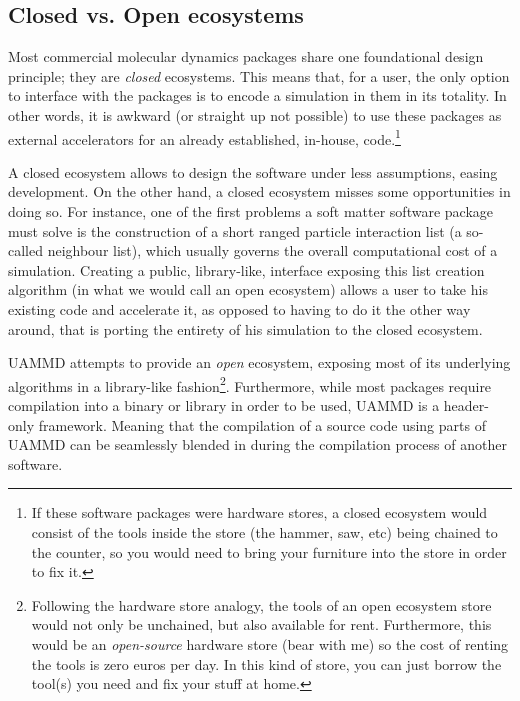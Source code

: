 \documentclass[twoside,openright,titlepage,numbers=noenddot,%
headinclude,footinclude,cleardoublepage=empty,abstract=on,
BCOR=5mm,fontsize=11pt, dvipsnames, paper=b5
]{scrreprt}
\newcommand{\uammd}{\gls{UAMMD}\xspace}
\newcommand{\gpu}{\gls{GPU}\xspace}
\begin{document}
\subsection*{Closed vs. Open ecosystems}
Most commercial molecular dynamics packages share one foundational design principle; they are \emph{closed} ecosystems. This means that, for a user, the only option to interface with the packages is to encode a simulation in them in its totality. In other words, it is awkward (or straight up not possible) to use these packages as external accelerators for an already established, in-house, code.\footnote{If these software packages were hardware stores, a closed ecosystem would consist of the tools inside the store (the hammer, saw, etc) being chained to the counter, so you would need to bring your furniture into the store in order to fix it.}  

A closed ecosystem allows to design the software under less assumptions, easing development. On the other hand, a closed ecosystem misses some opportunities in doing so. For instance, one of the first problems a soft matter software package must solve is the construction of a short ranged particle interaction list (a so-called neighbour list), which usually governs the overall computational cost of a simulation. Creating a public, library-like, interface exposing this list creation algorithm (in what we would call an open ecosystem) allows a user to take his existing code and accelerate it, as opposed to having to do it the other way around, that is porting the entirety of his simulation to the closed ecosystem.

\uammd attempts to provide an \emph{open} ecosystem, exposing most of its underlying algorithms in a library-like fashion\footnote{Following the hardware store analogy, the tools of an open ecosystem store would not only be unchained, but also available for rent. Furthermore, this would be an \emph{open-source} hardware store (bear with me) so the cost of renting the tools is zero euros per day. In this kind of store, you can just borrow the tool(s) you need and fix your stuff at home.}.
Furthermore, while most packages require compilation into a binary or library in order to be used, \uammd is a header-only framework. Meaning that the compilation of a source code using parts of \uammd can be seamlessly blended in during the compilation process of another software.


\newpage
\cleardoublepage
  
\end{document}
